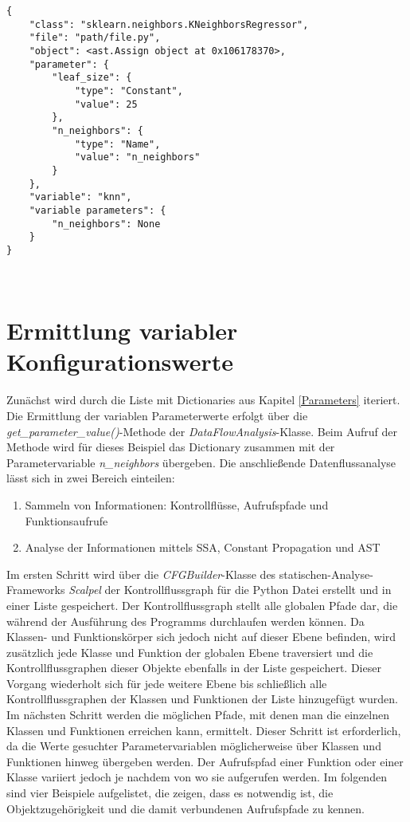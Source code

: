\documentclass[german,bachelor]{swsLeipzig}
\begin{document}
\noindent\begin{minipage}{\linewidth}
\begin{lstlisting}[style=json, frame=single, label=param_dict, basicstyle=\small, caption={Dictionary-Eintrag der KNeighborsRegressor-Klasse inklusive Parameter},captionpos=b]
{
    "class": "sklearn.neighbors.KNeighborsRegressor",
    "file": "path/file.py",
    "object": <ast.Assign object at 0x106178370>,
    "parameter": {
        "leaf_size": {
            "type": "Constant",
            "value": 25
        },
        "n_neighbors": {
            "type": "Name",
            "value": "n_neighbors"
        }
    },
    "variable": "knn",
    "variable parameters": {
        "n_neighbors": None
    }
}
\end{lstlisting}
\end{minipage}
\

\section{Ermittlung variabler Konfigurationswerte}\label{dataflow}
Zunächst wird durch die Liste mit Dictionaries aus Kapitel \ref{Parameters} iteriert.
Die Ermittlung der variablen Parameterwerte erfolgt über die \textit{get\_parameter\_value()}-Methode der \textit{DataFlowAnalysis}-Klasse.
Beim Aufruf der Methode wird für dieses Beispiel das Dictionary zusammen mit der Parametervariable \textit{n\_neighbors} übergeben.
Die anschließende Datenflussanalyse lässt sich in zwei Bereich einteilen:

\begin{enumerate}
 \item Sammeln von Informationen: Kontrollflüsse, Aufrufspfade und Funktionsaufrufe
 \item Analyse der Informationen mittels SSA, Constant Propagation und AST
\end{enumerate}

\noindent Im ersten Schritt wird über die \textit{CFGBuilder}-Klasse des statischen-Analyse-Frameworks \textit{Scalpel} der
Kontrollflussgraph für die Python Datei erstellt und in einer Liste gespeichert.
Der Kontrollflussgraph stellt alle globalen Pfade dar, die während der Ausführung des Programms durchlaufen werden können.
Da Klassen- und Funktionskörper sich jedoch nicht auf dieser Ebene befinden, wird zusätzlich jede Klasse und Funktion
der globalen Ebene traversiert und die Kontrollflussgraphen dieser Objekte ebenfalls in der Liste gespeichert.
Dieser Vorgang wiederholt sich für jede weitere Ebene bis schließlich alle Kontrollflussgraphen der
Klassen und Funktionen der Liste hinzugefügt wurden. \\
\indent Im nächsten Schritt werden die möglichen Pfade, mit denen man die einzelnen Klassen und Funktionen erreichen kann, ermittelt.
Dieser Schritt ist erforderlich, da die Werte gesuchter Parametervariablen möglicherweise über Klassen und Funktionen hinweg
übergeben werden.
Der Aufrufspfad einer Funktion oder einer Klasse variiert jedoch je nachdem von wo sie aufgerufen werden.
Im folgenden sind vier Beispiele aufgelistet, die zeigen, dass es notwendig ist, die Objektzugehörigkeit und die damit
verbundenen Aufrufspfade zu kennen.
\end{document}
